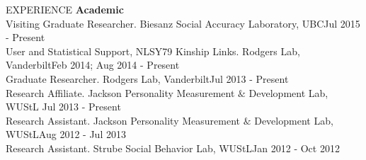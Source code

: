 \documentclass {resume}
\begin{document}
\begin{rSection}{\textrm{EXPERIENCE}}
{\large \textbf{Academic}}\\
Visiting Graduate Researcher. Biesanz Social Accuracy Laboratory, UBC\hfill Jul 2015 - Present\smallskip\\
User and Statistical Support, NLSY79 Kinship Links. Rodgers Lab, Vanderbilt\hfill Feb 2014; Aug 2014 - Present\smallskip\\%
Graduate Researcher. Rodgers Lab, Vanderbilt\hfill Jul 2013 - Present\smallskip\\
Research Affiliate. Jackson Personality Measurement $\&$ Development Lab, WUStL \hfill Jul 2013 - Present\smallskip\\
Research Assistant. Jackson Personality Measurement $\&$ Development Lab, WUStL\hfill Aug 2012 - Jul 2013\smallskip\\
Research Assistant. Strube Social Behavior Lab, WUStL\hfill Jan 2012 - Oct 2012\medskip\\%


\end{rSection}
\end{document}
